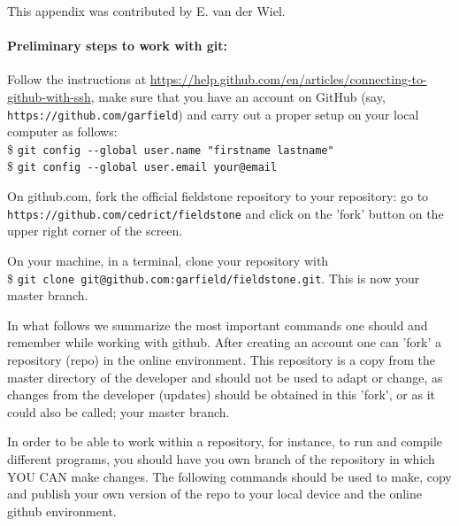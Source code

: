 \begin{mdframed}[backgroundcolor=red!5]
This appendix was contributed by E. van der Wiel.
\end{mdframed}



\paragraph{Preliminary steps to work with git:} 
Follow the instructions at \url{https://help.github.com/en/articles/connecting-to-github-with-ssh},
make sure that you have an account on GitHub (say, \verb"https://github.com/garfield") 
and carry out a proper setup on your local computer as follows:\\
\$ \verb'git config --global user.name "firstname lastname" '\\
\$ \verb'git config --global user.email your@email'


On github.com, fork the official fieldstone repository to your repository: 
go to \verb"https://github.com/cedrict/fieldstone" and click on the 'fork' button 
on the upper right corner of the screen.

On your machine, in a terminal, clone your repository with \\
\$ \verb"git clone git@github.com:garfield/fieldstone.git". This is now your master branch.

In what follows we summarize the most important commands one should and remember while working with github. After creating an account one can 'fork' a repository (repo) in the online environment. This repository is a copy from the master directory of the developer and should not be used to adapt or change, as changes from the developer (updates) should be obtained in this 'fork', or as it could also be called; your master branch. 
  
In order to be able to work within a repository, for instance, to run and compile different programs, you should have you own branch of the repository in which YOU CAN make changes. The following commands should be used to make, copy and publish your own version of the repo to your local device and the online github environment.

